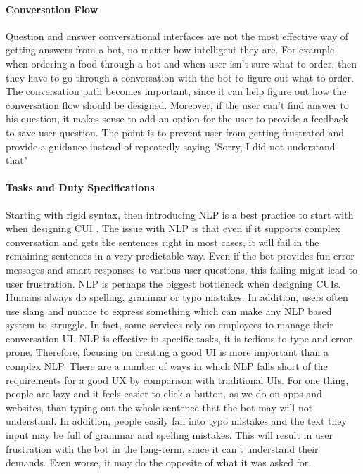 \paragraph{Conversation Flow}
Question and answer conversational interfaces are not the most effective way of getting answers from a bot, no matter how intelligent they are. For example, when ordering a food through a bot and when user isn't sure what to order, then they have to go through a conversation with the bot to figure out what to order. The conversation path becomes important, since it can help figure out how the conversation flow should be designed. Moreover, if the user can’t find answer to his question, it makes sense to add an option for the user to provide a feedback to save user question. The point is to prevent user from getting frustrated and provide a guidance instead of repeatedly saying "Sorry, I did not understand that"

\paragraph{Tasks and Duty Specifications}
Starting with rigid syntax, then introducing NLP is a best practice to start with when designing CUI \cite{fadhil2018}. The issue with NLP is that even if it supports complex conversation and gets the sentences right in most cases, it will fail in the remaining sentences in a very predictable way. Even if the bot provides fun error messages and smart responses to various user questions, this failing might lead to user frustration. NLP is perhaps the biggest bottleneck when designing CUIs. Humans always do spelling, grammar or typo mistakes. In addition, users often use slang and nuance to express something which can make any NLP based system to struggle. In fact, some services rely on employees to manage their conversation UI. NLP is effective in specific tasks, it is tedious to type and error prone. Therefore, focusing on creating a good UI is more important than a complex NLP. There are a number of ways in which NLP falls short of the requirements for a good UX by comparison with traditional UIs. For one thing, people are lazy and it feels easier to click a button, as we do on apps and websites, than typing out the whole sentence that the bot may will not understand. In addition, people easily fall into typo mistakes and the text they input may be full of grammar and spelling mistakes. This will result in user frustration with the bot in the long-term, since it can't understand their demands. Even worse, it may do the opposite of what it was asked for.


